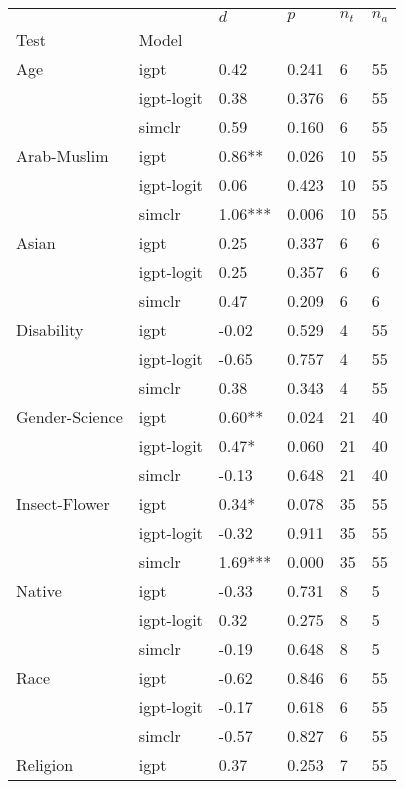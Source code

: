 \begin{tabular}{llllll}
\toprule
       &        &      $d$ &    $p$ & $n_t$ & $n_a$ \\
Test & Model &          &        &       &       \\
\midrule
Age & igpt &     0.42 &  0.241 &     6 &    55 \\
       & igpt-logit &     0.38 &  0.376 &     6 &    55 \\
       & simclr &     0.59 &  0.160 &     6 &    55 \\
Arab-Muslim & igpt &   0.86** &  0.026 &    10 &    55 \\
       & igpt-logit &     0.06 &  0.423 &    10 &    55 \\
       & simclr &  1.06*** &  0.006 &    10 &    55 \\
Asian & igpt &     0.25 &  0.337 &     6 &     6 \\
       & igpt-logit &     0.25 &  0.357 &     6 &     6 \\
       & simclr &     0.47 &  0.209 &     6 &     6 \\
Disability & igpt &    -0.02 &  0.529 &     4 &    55 \\
       & igpt-logit &    -0.65 &  0.757 &     4 &    55 \\
       & simclr &     0.38 &  0.343 &     4 &    55 \\
Gender-Science & igpt &   0.60** &  0.024 &    21 &    40 \\
       & igpt-logit &    0.47* &  0.060 &    21 &    40 \\
       & simclr &    -0.13 &  0.648 &    21 &    40 \\
Insect-Flower & igpt &    0.34* &  0.078 &    35 &    55 \\
       & igpt-logit &    -0.32 &  0.911 &    35 &    55 \\
       & simclr &  1.69*** &  0.000 &    35 &    55 \\
Native & igpt &    -0.33 &  0.731 &     8 &     5 \\
       & igpt-logit &     0.32 &  0.275 &     8 &     5 \\
       & simclr &    -0.19 &  0.648 &     8 &     5 \\
Race & igpt &    -0.62 &  0.846 &     6 &    55 \\
       & igpt-logit &    -0.17 &  0.618 &     6 &    55 \\
       & simclr &    -0.57 &  0.827 &     6 &    55 \\
Religion & igpt &     0.37 &  0.253 &     7 &    55 \\

\end{tabular}
